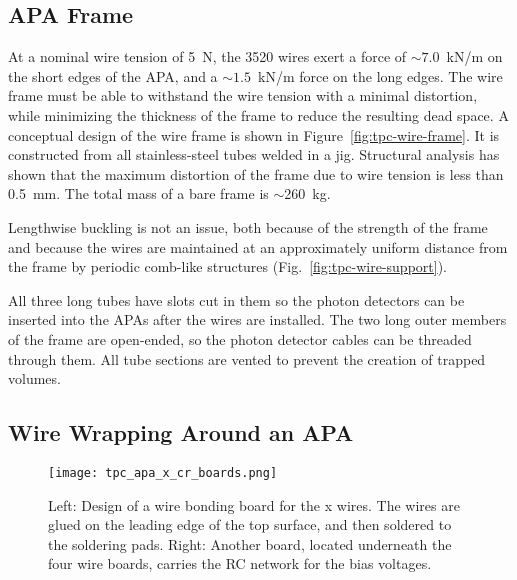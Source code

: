\subsection{APA Frame}

At a nominal wire tension of 5~N, the 3520 wires exert a force of 
$\sim 7.0$~kN/m on the short edges of the APA, and a 
$\sim 1.5 $~kN/m force on the long edges. The wire 
frame must be able to withstand the wire tension with a minimal 
distortion, while minimizing the thickness of the 
frame to reduce the resulting dead space. A conceptual design 
of the wire frame is shown in Figure~\ref{fig:tpc-wire-frame}.  
It is constructed from all stainless-steel tubes welded in a jig.  
Structural analysis has shown that the maximum distortion of the frame due to wire tension is less than 0.5~mm. The total mass of a bare frame is $\sim$260~kg.

Lengthwise buckling is not an issue, both because of the strength of the frame and because the wires are maintained at an approximately uniform distance from the frame by periodic comb-like structures (Fig.~\ref{fig:tpc-wire-support}).

All three long tubes have slots cut in them so the photon detectors can be inserted into the APAs after the wires are installed.  The two long outer members of the frame are open-ended, so the photon detector cables can be threaded through them.  All tube sections are vented to prevent the creation of trapped volumes.



\subsection{Wire Wrapping Around an APA}


\begin{figure}[htpb]
\centering
\texttt{[image: tpc\_apa\_x\_cr\_boards.png]}
\caption[Conceptual design of a wire bonding board for the x wires]{Left: Design of a wire bonding board for the x wires.  The wires are glued on the leading edge of the top surface, and then soldered to the soldering pads. Right: Another board, located underneath the four wire boards, carries the RC network for the bias voltages. }
\label{fig:tpc-wire-board-x}
\end{figure}



